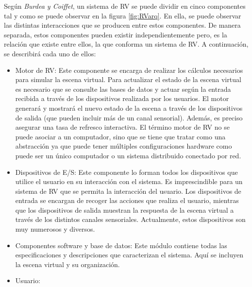 Según \emph{Burdea y Coiffet}\cite{burdea2003virtual}, un sistema de \ac{RV} se puede dividir en cinco componentes tal y como se puede observar en la figura \ref{fig:RVarq}. En ella, se puede observar las distintas interacciones que se producen entre estos componentes. De manera separada, estos componentes pueden existir independientemente pero, es la relación que existe entre ellos, la que conforma un sistema de \ac{RV}. A continuación, se describirá cada uno de ellos:
\begin{itemize}
    \item Motor de \ac{RV}: Este componente se encarga de realizar los cálculos necesarios para simular la escena virtual. Para actualizar el estado de la escena virtual es necesario que se consulte las bases de datos  y actuar según la entrada recibida a través de los dispositivos realizada por los usuarios. El motor generará y mostrará el nuevo estado de la escena a través de los dispositivos de salida (que pueden incluir más de un canal sensorial). Además, es preciso asegurar una tasa de refresco interactiva. El término motor de RV no se puede asociar a un computador, sino que se tiene que tratar como una abstracción ya que puede tener múltiples configuraciones hardware como puede ser un único computador o un sistema distribuido conectado por red.
    \item Dispositivos de \ac{E/S}: Este componente lo forman todos los dispositivos que utilice el usuario en su interacción con el sistema. Es imprescindible para un sistema de \ac{RV}  que se permita la interacción del usuario. Los dispositivos de entrada se encargan de recoger las acciones que realiza el usuario, mientras que los dispositivos de salida muestran la respuesta de la escena virtual a través de los distintos canales sensoriales. Actualmente, estos dispositivos son muy numerosos y diversos.
    \item Componentes software y base de datos: Este módulo contiene todas las especificaciones y descripciones que caracterizan el sistema. Aquí se incluyen la escena virtual y su organización.  %
    \item Usuario:  %

\end{itemize}
